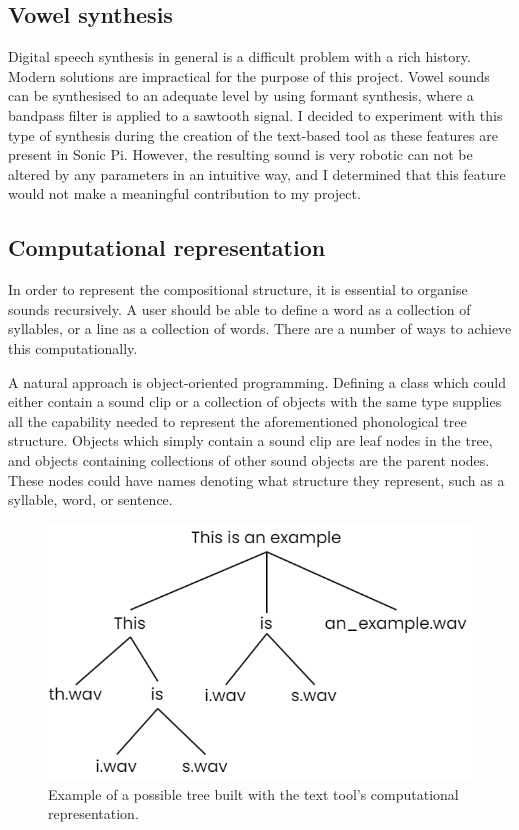 \documentclass[12pt,a4paper,oneside,openright]{report}
\begin{document}
\subsection{Vowel synthesis}\label{sec:vowel_synth}
Digital speech synthesis in general is a difficult problem with a rich history. Modern solutions are impractical for the purpose of this project. Vowel sounds can be synthesised to an adequate level by using formant synthesis, where a bandpass filter is applied to a sawtooth signal. I decided to experiment with this type of synthesis during the creation of the text-based tool as these features are present in Sonic Pi. However, the resulting sound is very robotic can not be altered by any parameters in an intuitive way, and I determined that this feature would not make a meaningful contribution to my project.

\subsection{Computational representation}\label{sec:comp_rep}
In order to represent the compositional structure, it is essential to organise sounds recursively. A user should be able to define a word as a collection of syllables, or a line as a collection of words. There are a number of ways to achieve this computationally.

A natural approach is object-oriented programming. Defining a class which could either contain a sound clip or a collection of objects with the same type supplies all the capability needed to represent the aforementioned phonological tree structure. Objects which simply contain a sound clip are leaf nodes in the tree, and objects containing collections of other sound objects are the parent nodes. These nodes could have names denoting what structure they represent, such as a syllable, word, or sentence.

\begin{figure}[h!]
    \centering
    \includegraphics[scale=0.5]{images/tree_structure_example.png}
    \caption{Example of a possible tree built with the text tool's computational representation.}
    \label{fig:tree_struct_ex}
\end{figure}
\end{document}
